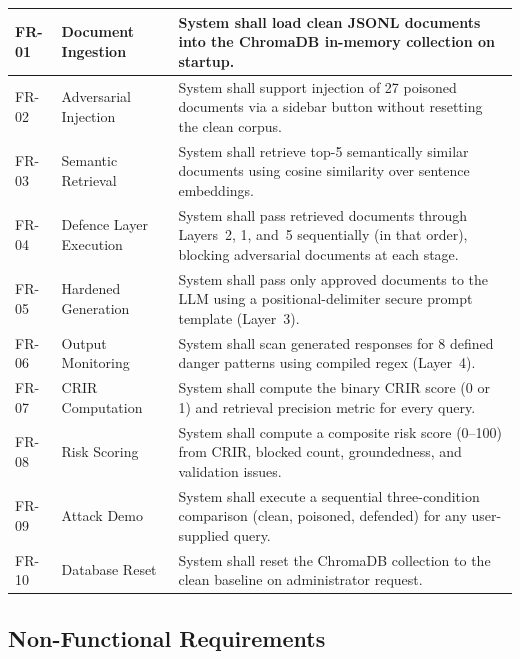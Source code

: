\begin{longtable}{|p{1.2cm}|p{3.8cm}|p{7.0cm}|}
FR-01 & Document Ingestion       & System shall load clean JSONL documents into the
                                    ChromaDB in-memory collection on startup. \\
\hline
FR-02 & Adversarial Injection    & System shall support injection of 27 poisoned documents
                                    via a sidebar button without resetting the clean corpus. \\
\hline
FR-03 & Semantic Retrieval       & System shall retrieve top-5 semantically similar
                                    documents using cosine similarity over sentence embeddings. \\
\hline
FR-04 & Defence Layer Execution  & System shall pass retrieved documents through Layers~2,
                                    1, and~5 sequentially (in that order), blocking
                                    adversarial documents at each stage. \\
\hline
FR-05 & Hardened Generation      & System shall pass only approved documents to the LLM
                                    using a positional-delimiter secure prompt template
                                    (Layer~3). \\
\hline
FR-06 & Output Monitoring        & System shall scan generated responses for 8 defined
                                    danger patterns using compiled regex (Layer~4). \\
\hline
FR-07 & CRIR Computation         & System shall compute the binary CRIR score (0 or 1)
                                    and retrieval precision metric for every query. \\
\hline
FR-08 & Risk Scoring             & System shall compute a composite risk score (0--100)
                                    from CRIR, blocked count, groundedness, and validation
                                    issues. \\
\hline
FR-09 & Attack Demo              & System shall execute a sequential three-condition
                                    comparison (clean, poisoned, defended) for any
                                    user-supplied query. \\
\hline
FR-10 & Database Reset           & System shall reset the ChromaDB collection to the clean
                                    baseline on administrator request. \\
\hline

\end{longtable}

\subsection{Non-Functional Requirements}

